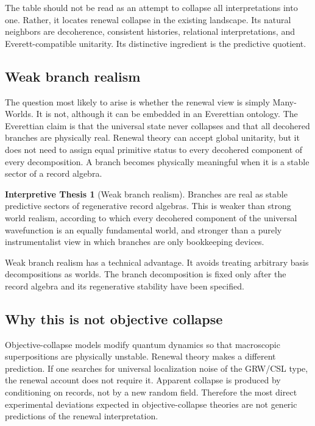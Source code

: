 \documentclass[11pt]{article}
\numberwithin{equation}{section}
\theoremstyle{definition}
\newtheorem{interpretation}[theorem]{Interpretive Thesis}
\theoremstyle{remark}
\begin{document}
The table should not be read as an attempt to collapse all interpretations into one.  Rather, it locates renewal collapse in the existing landscape.  Its natural neighbors are decoherence, consistent histories, relational interpretations, and Everett-compatible unitarity.  Its distinctive ingredient is the predictive quotient.

\subsection{Weak branch realism}

The question most likely to arise is whether the renewal view is simply Many-Worlds.  It is not, although it can be embedded in an Everettian ontology.  The Everettian claim is that the universal state never collapses and that all decohered branches are physically real.  Renewal theory can accept global unitarity, but it does not need to assign equal primitive status to every decohered component of every decomposition.  A branch becomes physically meaningful when it is a stable sector of a record algebra.

\begin{interpretation}[Weak branch realism]
\label{interp:weak-branch}
Branches are real as stable predictive sectors of regenerative record algebras.  This is weaker than strong world realism, according to which every decohered component of the universal wavefunction is an equally fundamental world, and stronger than a purely instrumentalist view in which branches are only bookkeeping devices.
\end{interpretation}

Weak branch realism has a technical advantage.  It avoids treating arbitrary basis decompositions as worlds.  The branch decomposition is fixed only after the record algebra and its regenerative stability have been specified.

\subsection{Why this is not objective collapse}

Objective-collapse models modify quantum dynamics so that macroscopic superpositions are physically unstable.  Renewal theory makes a different prediction.  If one searches for universal localization noise of the GRW/CSL type, the renewal account does not require it.  Apparent collapse is produced by conditioning on records, not by a new random field.  Therefore the most direct experimental deviations expected in objective-collapse theories are not generic predictions of the renewal interpretation.
\end{document}

